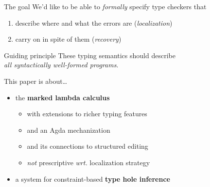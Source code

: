 \begin{frame}{The goal}
  We'd like to be able to \emph{formally} specify type checkers that \\[0.5em]

  \pause
  \begin{enumerate}
    \item describe where and what the errors are \pause (\emph{localization})
    
      \pause
    \item carry on in spite of them \pause (\emph{recovery})
  \end{enumerate}

  \vspace{1em}
  \pause
  \begin{mainbox}[]{Guiding principle}
    \pause
    These typing semantics should describe \\
    \emph{all syntactically well-formed programs}.
  \end{mainbox}
\end{frame}

\begin{frame}{This paper is about\ldots}
  \begin{itemize}
    \item<1-> the \textbf{marked lambda calculus}%

      \begin{itemize}
        \item<5-> with extensions to richer typing features
        \item<6-> and an Agda mechanization
        \item<7-> and its connections to structured editing
        \item<8-> \emph{not} prescriptive \emph{wrt.} localization strategy
      \end{itemize}

    \item<9-> a system for constraint-based \textbf{type hole inference}
  \end{itemize}
\end{frame}
